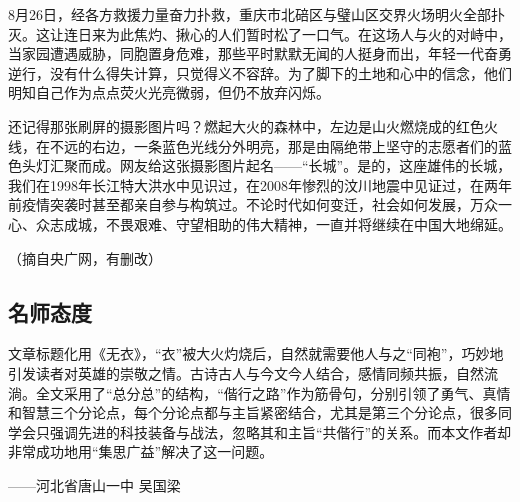 8月26日，经各方救援力量奋力扑救，重庆市北碚区与璧山区交界火场明火全部扑灭。这让连日来为此焦灼、揪心的人们暂时松了一口气。在这场人与火的对峙中，当家园遭遇威胁，同胞置身危难，那些平时默默无闻的人挺身而出，年轻一代奋勇逆行，没有什么得失计算，只觉得义不容辞。为了脚下的土地和心中的信念，他们明知自己作为点点荧火光亮微弱，但仍不放弃闪烁。

还记得那张刷屏的摄影图片吗？燃起大火的森林中，左边是山火燃烧成的红色火线，在不远的右边，一条蓝色光线分外明亮，那是由隔绝带上坚守的志愿者们的蓝色头灯汇聚而成。网友给这张摄影图片起名——“长城”。是的，这座雄伟的长城，我们在1998年长江特大洪水中见识过，在2008年惨烈的汶川地震中见证过，在两年前疫情突袭时甚至都亲自参与构筑过。不论时代如何变迁，社会如何发展，万众一心、众志成城，不畏艰难、守望相助的伟大精神，一直并将继续在中国大地绵延。

（摘自央广网，有删改）

\subsection*{名师态度}

文章标题化用《无衣》，“衣”被大火灼烧后，自然就需要他人与之“同袍”，巧妙地引发读者对英雄的崇敬之情。古诗古人与今文今人结合，感情同频共振，自然流淌。全文采用了“总分总”的结构，“偕行之路”作为筋骨句，分别引领了勇气、真情和智慧三个分论点，每个分论点都与主旨紧密结合，尤其是第三个分论点，很多同学会只强调先进的科技装备与战法，忽略其和主旨“共偕行”的关系。而本文作者却非常成功地用“集思广益”解决了这一问题。

——河北省唐山一中 吴国梁
